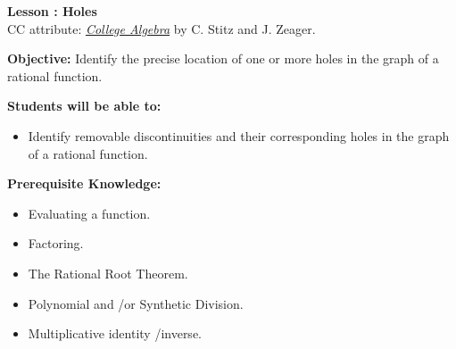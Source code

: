 \documentclass[12pt]{article}
\theoremstyle{definition}
\begin{document}
{\bf \large Lesson : Holes}\label{les:holes}
\\ CC attribute: \href{http://www.stitz-zeager.com}{\it{College Algebra}} by C. Stitz and J. Zeager. 
\hfill \doclicenseImage[imagewidth=5em]\\
\par
{\bf Objective:} Identify the precise location of one or more holes in the graph of a rational function.\\
\par
{\bf Students will be able to:}
\begin{itemize}
	\item Identify removable discontinuities and their corresponding holes in the graph of a rational function.
\end{itemize}
{\bf Prerequisite Knowledge:}
\begin{itemize}
	\item Evaluating a function.
	\item Factoring.
	\item The Rational Root Theorem.
	\item Polynomial and \slash or Synthetic Division.
 	\item Multiplicative identity \slash inverse.
\end{itemize}
\hrulefill
\end{document}
